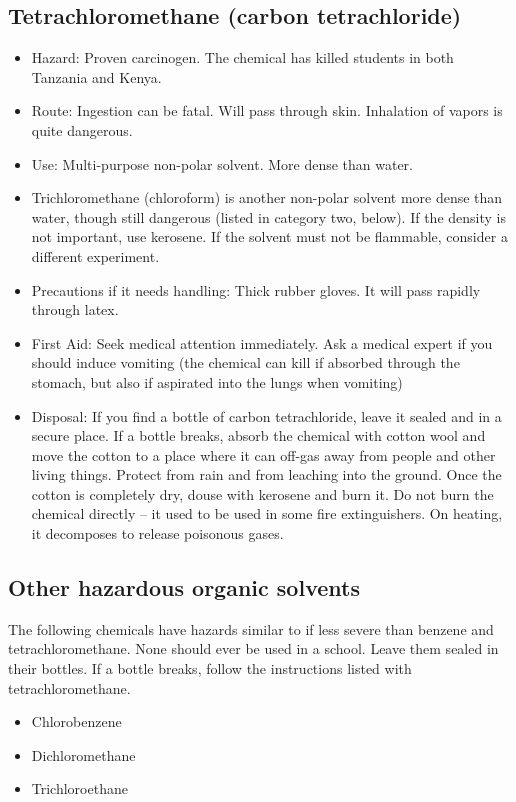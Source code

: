 \subsection{Tetrachloromethane (carbon tetrachloride)}
\begin{itemize}
\item{Hazard: Proven carcinogen. 
The chemical has killed students in both Tanzania and Kenya.}
\item{Route: Ingestion can be fatal. 
Will pass through skin. 
Inhalation of vapors is quite dangerous.}
\item{Use: Multi-purpose non-polar solvent. 
More dense than water.}
\item{Trichloromethane (chloroform) is 
another non-polar solvent more dense than water, 
though still dangerous (listed in category two, below). 
If the density is not important, use kerosene. 
If the solvent must not be flammable, 
consider a different experiment.}
\item{Precautions if it needs handling: Thick rubber gloves. 
It will pass rapidly through latex.}
\item{First Aid: Seek medical attention immediately. 
Ask a medical expert if you should induce vomiting 
(the chemical can kill if absorbed through the stomach, 
but also if aspirated into the lungs when vomiting)}
\item{Disposal: If you find a bottle of carbon tetrachloride, 
leave it sealed and in a secure place. 
If a bottle breaks, 
absorb the chemical with cotton wool 
and move the cotton to a place where it can off-gas 
away from people and other living things. 
Protect from rain and from leaching into the ground. 
Once the cotton is completely dry, 
douse with kerosene and burn it. 
Do not burn the chemical directly – 
it used to be used in some fire extinguishers. 
On heating, it decomposes to release poisonous gases.}
\end{itemize}

\subsection{Other hazardous organic solvents}
The following chemicals have hazards similar to 
if less severe than benzene and tetrachloromethane. 
None should ever be used in a school. 
Leave them sealed in their bottles. 
If a bottle breaks, follow the instructions 
listed with tetrachloromethane.
\begin{itemize}
\item{Chlorobenzene}
\item{Dichloromethane}
\item{Trichloroethane}
\end{itemize}

